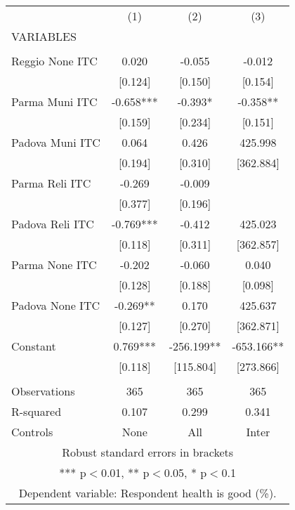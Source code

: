 \begin{tabular}{lccc} \hline
 & (1) & (2) & (3) \\
VARIABLES &  &  &  \\ \hline
 &  &  &  \\
Reggio None ITC & 0.020 & -0.055 & -0.012 \\
 & [0.124] & [0.150] & [0.154] \\
Parma Muni ITC & -0.658*** & -0.393* & -0.358** \\
 & [0.159] & [0.234] & [0.151] \\
Padova Muni ITC & 0.064 & 0.426 & 425.998 \\
 & [0.194] & [0.310] & [362.884] \\
Parma Reli ITC & -0.269 & -0.009 &  \\
 & [0.377] & [0.196] &  \\
Padova Reli ITC & -0.769*** & -0.412 & 425.023 \\
 & [0.118] & [0.311] & [362.857] \\
Parma None ITC & -0.202 & -0.060 & 0.040 \\
 & [0.128] & [0.188] & [0.098] \\
Padova None ITC & -0.269** & 0.170 & 425.637 \\
 & [0.127] & [0.270] & [362.871] \\
Constant & 0.769*** & -256.199** & -653.166** \\
 & [0.118] & [115.804] & [273.866] \\
 &  &  &  \\
Observations & 365 & 365 & 365 \\
R-squared & 0.107 & 0.299 & 0.341 \\
 Controls & None & All & Inter \\ \hline
\multicolumn{4}{c}{ Robust standard errors in brackets} \\
\multicolumn{4}{c}{ *** p$<$0.01, ** p$<$0.05, * p$<$0.1} \\
\multicolumn{4}{c}{ Dependent variable: Respondent health is good (\%).} \\
\end{tabular}
